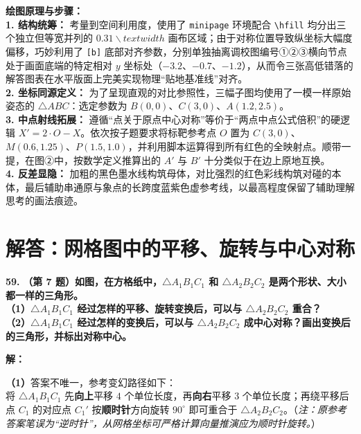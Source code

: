 \documentclass[12pt, a4paper]{ctexrep}
\begin{document}
\vspace{0.4cm}
{\small\color{blue!70!black}
\textbf{绘图原理与步骤：}\\
\textbf{1. 结构统筹：} 考量到空间利用度，使用了 \texttt{minipage} 环境配合 \texttt{\textbackslash{}hfill} 均分出三个独立但等宽并列的 $0.31\backslash{}textwidth$ 画布区域；由于对称位置导致纵坐标大幅度偏移，巧妙利用了 \texttt{[b]} 底部对齐参数，分别单独抽离调校图编号①②③横向节点处于画面底端的特定相对 $y$ 坐标处（$-3.2$、$-0.7$、$-1.2$），从而令三张高低错落的解答图表在水平版面上完美实现物理“贴地基准线”对齐。\\
\textbf{2. 坐标同源定义：} 为了呈现直观的对比参照性，三幅子图均使用了一模一样原始姿态的 $\triangle ABC$：选定参数为 $B(0,0)$、$C(3,0)$、$A(1.2, 2.5)$。\\
\textbf{3. 中点射线拓展：} 遵循“点关于原点中心对称”等价于“两点中点公式倍积”的硬逻辑 $X'=2 \cdot O-X$。依次按子题要求将标靶参考点 $O$ 置为 $C(3,0)$、$M(0.6, 1.25)$、$P(1.5, 1.0)$，并利用脚本运算得到所有红色的全映射点。顺带一提，在图②中，按数学定义推算出的 $A'$ 与 $B'$ 十分类似于在边上原地互换。\\
\textbf{4. 反差显隐：} 加粗的黑色墨水线构筑母体，对比强烈的红色彩线构筑对碰的本体，最后辅助串通原与象点的长跨度蓝紫色虚参考线，以最高程度保留了辅助理解思考的画法痕迹。
}

\newpage

\section{解答：网格图中的平移、旋转与中心对称}

\vspace{0.6cm}

\textbf{\LARGE 59.} \textbf{（第 7 题）如图，在方格纸中，$\triangle A_1B_1C_1$ 和 $\triangle A_2B_2C_2$ 是两个形状、大小都一样的三角形。\\
（1）$\triangle A_1B_1C_1$ 经过怎样的平移、旋转变换后，可以与 $\triangle A_2B_2C_2$ 重合？\\
（2）$\triangle A_1B_1C_1$ 经过怎样的变换后，可以与 $\triangle A_2B_2C_2$ 成中心对称？画出变换后的三角形，并标出对称中心。}

\vspace{0.4cm}
\textbf{解：}

\textbf{（1）}答案不唯一，参考变幻路径如下：\\
将 $\triangle A_1B_1C_1$ 先\textbf{向上}平移 $4$ 个单位长度，再\textbf{向右}平移 $3$ 个单位长度；再绕平移后点 $C_1$ 的对应点 $C_1'$ 按\textbf{顺时针}方向旋转 $90^\circ$ 即可重合于 $\triangle A_2B_2C_2$。（\textit{注：原参考答案笔误为“逆时针”，从网格坐标可严格计算向量推演应为顺时针旋转。}）
\end{document}
